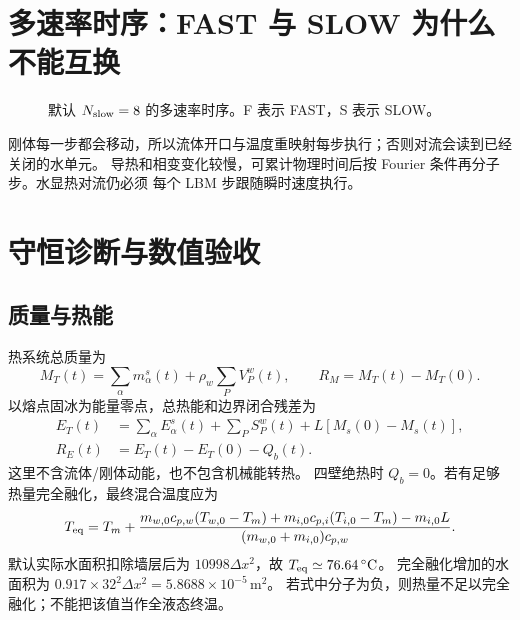 \documentclass[UTF8,zihao=-4]{ctexart}
\numberwithin{equation}{section}
\begin{document}
\section{多速率时序：FAST 与 SLOW 为什么不能互换}

\begin{figure}[H]
\centering
{}
\caption{默认 $N_{\rm slow}=8$ 的多速率时序。F 表示 FAST，S 表示 SLOW。}
\label{fig:multirate}
\end{figure}

刚体每一步都会移动，所以流体开口与温度重映射每步执行；否则对流会读到已经关闭的水单元。
导热和相变变化较慢，可累计物理时间后按 Fourier 条件再分子步。水显热对流仍必须
每个 LBM 步跟随瞬时速度执行。

\section{守恒诊断与数值验收}

\subsection{质量与热能}

热系统总质量为
\begin{equation}
  M_T(t)=\sum_\alpha m_\alpha^s(t)+\rho_w\sum_PV_P^w(t),
  \qquad R_M=M_T(t)-M_T(0).
  \label{eq:total-mass}
\end{equation}
以熔点固冰为能量零点，总热能和边界闭合残差为
\begin{align}
  E_T(t)&=\sum_\alpha E_\alpha^s(t)+\sum_PS_P^w(t)
  +L[M_s(0)-M_s(t)],\\
  R_E(t)&=E_T(t)-E_T(0)-Q_b(t).
  \label{eq:total-energy}
\end{align}
这里不含流体/刚体动能，也不包含机械能转热。
四壁绝热时 $Q_b=0$。若有足够热量完全融化，最终混合温度应为
\begin{equation}
 T_{\rm eq}=T_m+
 \frac{m_{w,0}c_{p,w}(T_{w,0}-T_m)+m_{i,0}c_{p,i}(T_{i,0}-T_m)-m_{i,0}L}
 {(m_{w,0}+m_{i,0})c_{p,w}}.
\end{equation}
默认实际水面积扣除墙层后为 $10998\Delta x^2$，故 $T_{\rm eq}\simeq76.64\,^{\circ}\mathrm C$。
完全融化增加的水面积为 $0.917\times32^2\Delta x^2=5.8688\times10^{-5}\,\mathrm m^2$。
若式中分子为负，则热量不足以完全融化；不能把该值当作全液态终温。
\end{document}
